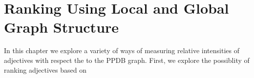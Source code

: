 \section{Ranking Using Local and Global Graph Structure}


In this chapter we explore a variety of ways of measuring relative intensities of adjectives with respect the to the PPDB graph. First, we explore the possiblity of ranking adjectives based on 


